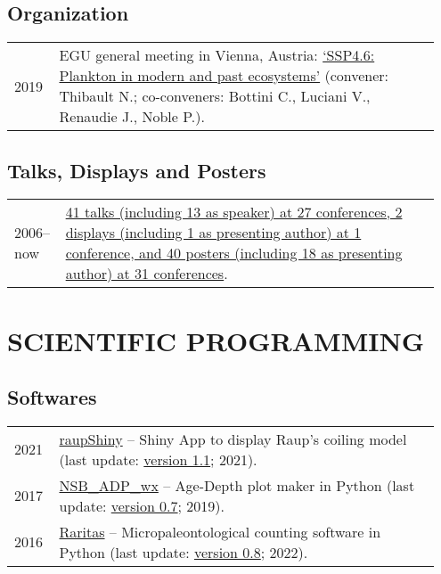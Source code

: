 \documentclass[11pt, a4paper]{article}
\begin{document}
\subsection{Organization}
\begin{longtable}{@{}p{0.1\linewidth} >{\small}P{0.85\linewidth}@{}}
2019 & EGU general meeting in Vienna, Austria: \href{https://meetingorganizer.copernicus.org/EGU2019/session/31041}{`SSP4.6: Plankton in modern and past ecosystems'} (convener: Thibault N.; co-conveners: Bottini C., Luciani V., Renaudie J., Noble P.).
\end{longtable}

\subsection[Talks, Displays and Posters]{Talks, Displays and Posters}
\begin{longtable}{@{}p{0.1\linewidth} >{\small}P{0.85\linewidth}@{}}
2006--now  & \href{http://plannapus.github.io/static/conffull.pdf}{41 talks (including 13 as speaker) at 27 conferences, 2 displays (including 1 as presenting author) at 1 conference, and 40 posters (including 18 as presenting author) at 31 conferences}.
\end{longtable}

\section{SCIENTIFIC PROGRAMMING}
\subsection{Softwares}
\begin{longtable}{@{}p{0.1\linewidth} >{\small}P{0.85\linewidth}@{}}
2021 & \href{http://github.com/plannapus/raupShiny/releases}{raupShiny} -- Shiny App to display Raup's coiling model (last update: \href{https://doi.org/10.5281/zenodo.5171827}{version 1.1}; 2021).\\
2017 & \href{http://github.com/plannapus/NSB_ADP_wx/releases}{NSB\_ADP\_wx} -- Age-Depth plot maker in Python (last update: \href{http://doi.org/10.5281/zenodo.3408657}{version 0.7}; 2019).\\
2016 & \href{http://github.com/plannapus/Raritas/releases}{Raritas} -- Micropaleontological counting software in Python (last update: \href{https://github.com/plannapus/Raritas/releases/tag/v0.8}{version 0.8}; 2022).\\
\end{longtable}
\end{document}
